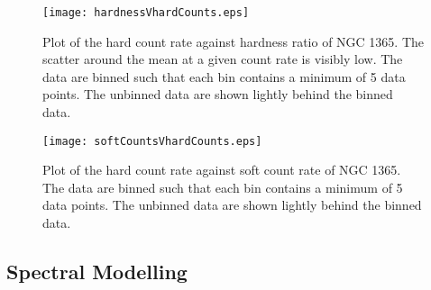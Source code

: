 \documentclass[useAMS,usenatbib]{sam}
\begin{document}
\begin{figure}
	\texttt{[image: hardnessVhardCounts.eps]}
	\caption{Plot of the hard count rate against hardness ratio of NGC 1365. The scatter around the mean at a given count rate is visibly low. The data are binned
such that each bin contains a minimum of 5 data points. The unbinned data are shown lightly behind the binned data.}
	\label{hardness}
\end{figure}
				
\begin{figure}
	\texttt{[image: softCountsVhardCounts.eps]}
	\caption{Plot of the hard count rate against soft count rate of NGC 1365. The data are binned such that each bin contains a minimum of 5 data points. The unbinned
data are shown lightly behind the binned data.}
	\label{counts}
\end{figure}

\subsection{Spectral Modelling}
\end{document}
